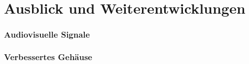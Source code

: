 \chapter{Ausblick und Weiterentwicklungen}
\subsection{Audiovisuelle Signale}

\subsection{Verbessertes Gehäuse}